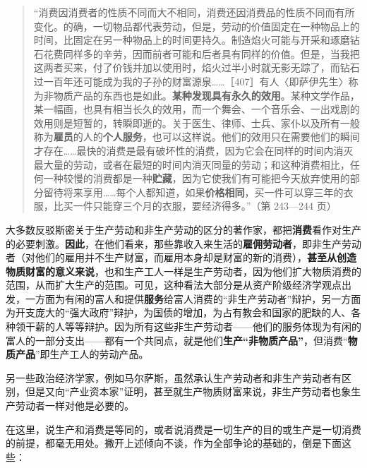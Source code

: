 \begin{quote}“消费因消费者的性质不同而大不相同，消费还因消费品的性质不同而有所变化。的确，一切物品都代表劳动，但是，劳动的价值固定在一种物品上的时间，比固定在另一种物品上的时间更持久。制造焰火可能与开采和琢磨钻石花费同样多的辛劳，因而前者可能和后者具有同样的价值。但是，当我把这两者买来，付了价钱并加以使用时，焰火过半小时就无影无踪了，而钻石过一百年还可能成为我的子孙的财富源泉……［407］有人〈即萨伊先生〉称为非物质产品的东西也是如此。\textbf{某种发现具有永久的效用}。某种文学作品，某一幅画，也具有相当长久的效用，而一个舞会、一个音乐会、一出戏剧的效用则是短暂的，转瞬即逝的。关于医生、律师、士兵、家仆以及所有一般称为\textbf{雇员}的人的\textbf{个人服务}，也可以这样说。他们的效用只在需要他们的瞬间才存在……最快的消费是最有破坏性的消费，因为它会在同样的时间内消灭最大量的劳动，或者在最短的时间内消灭同量的劳动；和这种消费相比，任何一种较慢的消费都是一种\textbf{贮藏}，因为它使我们有可能把今天放弃使用的部分留待将来享用……每个人都知道，如果\textbf{价格相同}，买一件可以穿三年的衣服，比买一件只能穿三个月的衣服，要经济得多。”（第 243—244 页）\end{quote}


大多数反驳斯密关于生产劳动和非生产劳动的区分的著作家，都把\textbf{消费}看作对生产的必要刺激。\textbf{因此}，在他们看来，那些靠收入来生活的\textbf{雇佣劳动者}，即非生产劳动者（对他们的雇用并不生产财富，而雇用本身却是财富的新的消费），\textbf{甚至从创造物质财富的意义来说}，也和生产工人一样是生产劳动者，因为他们扩大物质消费的范围，从而扩大生产的范围。可见，这种看法大部分是从资产阶级经济学观点出发，一方面为有闲的富人和提供\textbf{服务}给富人消费的“非生产劳动者”辩护，另一方面为开支庞大的“强大政府”辩护，为国债的增加，为占有教会和国家的肥缺的人、各种领干薪的人等等辩护。因为所有这些非生产劳动者——他们的服务体现为有闲的富人的一部分支出——都有一个共同点，就是他们\textbf{生产“非物质产品”}，但消费“\textbf{物质产品}”即生产工人的劳动产品。

另一些政治经济学家，例如马尔萨斯，虽然承认生产劳动者和非生产劳动者有区别，但是又向“产业资本家”证明，甚至就生产物质财富来说，非生产劳动者也象生产劳动者一样对他是必要的。

在这里，说生产和消费是等同的，或者说消费是一切生产的目的或生产是一切消费的前提，都毫无用处。撇开上述倾向不谈，作为全部争论的基础的，倒是下面这些：

